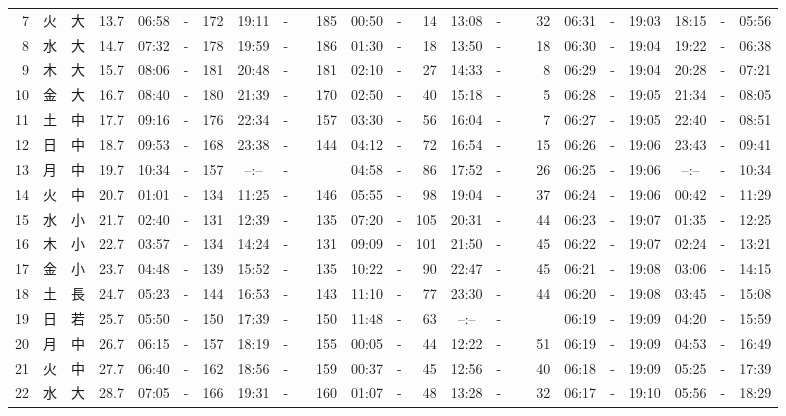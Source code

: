 \documentclass[12pt,a4j]{jsarticle}
\begin{document}
\begin{table}[htbp]
\begin{center}
{\begin{tabular}{|rc|cr|ccrccr|ccrccr|ccc|ccc|}
 7 & 火 & 大 & 13.7 &  06:58 &-& 172 &  19:11 &-& 185 &  00:50 &-&  14 &  13:08 &-&  32 & 06:31 & -& 19:03 & 18:15 & -& 05:56 \\
 8 & 水 & 大 & 14.7 &  07:32 &-& 178 &  19:59 &-& 186 &  01:30 &-&  18 &  13:50 &-&  18 & 06:30 & -& 19:04 & 19:22 & -& 06:38 \\
 9 & 木 & 大 & 15.7 &  08:06 &-& 181 &  20:48 &-& 181 &  02:10 &-&  27 &  14:33 &-&   8 & 06:29 & -& 19:04 & 20:28 & -& 07:21 \\
10 & 金 & 大 & 16.7 &  08:40 &-& 180 &  21:39 &-& 170 &  02:50 &-&  40 &  15:18 &-&   5 & 06:28 & -& 19:05 & 21:34 & -& 08:05 \\
11 & 土 & 中 & 17.7 &  09:16 &-& 176 &  22:34 &-& 157 &  03:30 &-&  56 &  16:04 &-&   7 & 06:27 & -& 19:05 & 22:40 & -& 08:51 \\
12 & 日 & 中 & 18.7 &  09:53 &-& 168 &  23:38 &-& 144 &  04:12 &-&  72 &  16:54 &-&  15 & 06:26 & -& 19:06 & 23:43 & -& 09:41 \\
13 & 月 & 中 & 19.7 &  10:34 &-& 157 &  --:-- &-&~~~~~ &  04:58 &-&  86 &  17:52 &-&  26 & 06:25 & -& 19:06 & --:-- & -& 10:34 \\
14 & 火 & 中 & 20.7 &  01:01 &-& 134 &  11:25 &-& 146 &  05:55 &-&  98 &  19:04 &-&  37 & 06:24 & -& 19:06 & 00:42 & -& 11:29 \\
15 & 水 & 小 & 21.7 &  02:40 &-& 131 &  12:39 &-& 135 &  07:20 &-& 105 &  20:31 &-&  44 & 06:23 & -& 19:07 & 01:35 & -& 12:25 \\
16 & 木 & 小 & 22.7 &  03:57 &-& 134 &  14:24 &-& 131 &  09:09 &-& 101 &  21:50 &-&  45 & 06:22 & -& 19:07 & 02:24 & -& 13:21 \\
17 & 金 & 小 & 23.7 &  04:48 &-& 139 &  15:52 &-& 135 &  10:22 &-&  90 &  22:47 &-&  45 & 06:21 & -& 19:08 & 03:06 & -& 14:15 \\
18 & 土 & 長 & 24.7 &  05:23 &-& 144 &  16:53 &-& 143 &  11:10 &-&  77 &  23:30 &-&  44 & 06:20 & -& 19:08 & 03:45 & -& 15:08 \\
19 & 日 & 若 & 25.7 &  05:50 &-& 150 &  17:39 &-& 150 &  11:48 &-&  63 &  --:-- &-&~~~~~ & 06:19 & -& 19:09 & 04:20 & -& 15:59 \\
20 & 月 & 中 & 26.7 &  06:15 &-& 157 &  18:19 &-& 155 &  00:05 &-&  44 &  12:22 &-&  51 & 06:19 & -& 19:09 & 04:53 & -& 16:49 \\
21 & 火 & 中 & 27.7 &  06:40 &-& 162 &  18:56 &-& 159 &  00:37 &-&  45 &  12:56 &-&  40 & 06:18 & -& 19:09 & 05:25 & -& 17:39 \\
22 & 水 & 大 & 28.7 &  07:05 &-& 166 &  19:31 &-& 160 &  01:07 &-&  48 &  13:28 &-&  32 & 06:17 & -& 19:10 & 05:56 & -& 18:29 \\

\end{tabular}}
\end{center}
\end{table}
\end{document}
